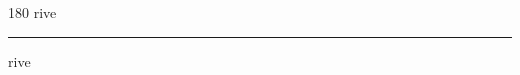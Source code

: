 
\begin{frame}
\begin{center}
\begin{turn}{180}
{\fontsize{2.5cm}{1em}\selectfont rive}
\end{turn}
\vspace{1em}\par  
\hrule
\vspace{1em}\par  
{\fontsize{2.5cm}{1em}\selectfont rive}
\end{center}
\end{frame}
